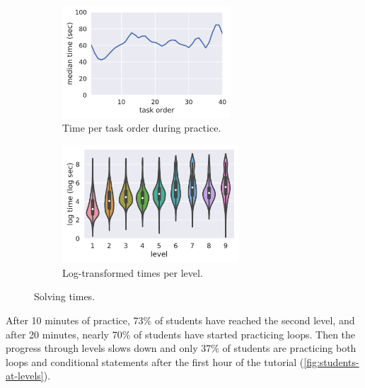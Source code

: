 \begin{figure}[htb]
\centering
\begin{subfigure}{.48\textwidth}
\centering
\includegraphics[height=42mm]{img/median-time-order}
\caption{Time per task order during practice.}
\end{subfigure}
\begin{subfigure}{.51\textwidth}
\centering
\includegraphics[height=44mm]{img/levels-time}
\caption{Log-transformed times per level.}
\end{subfigure}
\caption{Solving times.}
\label{fig:solving-times}
\end{figure}


After 10 minutes of practice, 73\% of students have reached the second level,
and after 20 minutes, nearly 70\% of students have started practicing loops.
Then the progress through levels slows down and only 37\% of students
are practicing both loops and conditional statements after the first
hour of the tutorial (\cref{fig:students-at-levels}).

